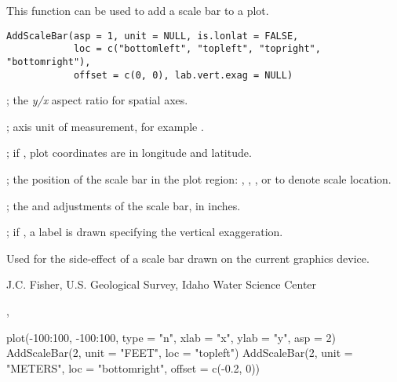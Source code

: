 \documentclass[letterpaper]{book}
\begin{document}
%
\begin{Description}\relax
This function can be used to add a scale bar to a plot.
\end{Description}
%
\begin{Usage}
\begin{verbatim}
AddScaleBar(asp = 1, unit = NULL, is.lonlat = FALSE,
            loc = c("bottomleft", "topleft", "topright", "bottomright"),
            offset = c(0, 0), lab.vert.exag = NULL)
\end{verbatim}
\end{Usage}
%
\begin{Arguments}
\begin{ldescription}
\item[\code{asp}] ; the \emph{y/x} aspect ratio for spatial axes.
\item[\code{unit}] ; axis unit of measurement, for example .
\item[\code{is.lonlat}] ; if , plot coordinates are in longitude and latitude.
\item[\code{loc}] ; the position of the scale bar in the plot region: , , , or  to denote scale location.
\item[\code{offset}] ; the  and  adjustments of the scale bar, in inches.
\item[\code{lab.vert.exag}] ; if , a label is drawn specifying the vertical exaggeration.
\end{ldescription}
\end{Arguments}
%
\begin{Value}
Used for the side-effect of a scale bar drawn on the current graphics device.
\end{Value}
%
\begin{Author}\relax
J.C. Fisher, U.S. Geological Survey, Idaho Water Science Center
\end{Author}
%
\begin{SeeAlso}\relax
{}, 
\end{SeeAlso}
%
\begin{Examples}
\begin{ExampleCode}
plot(-100:100, -100:100, type = "n", xlab = "x", ylab = "y", asp = 2)
AddScaleBar(2, unit = "FEET", loc = "topleft")
AddScaleBar(2, unit = "METERS", loc = "bottomright", offset = c(-0.2, 0))
\end{ExampleCode}
\end{Examples}
\end{document}
